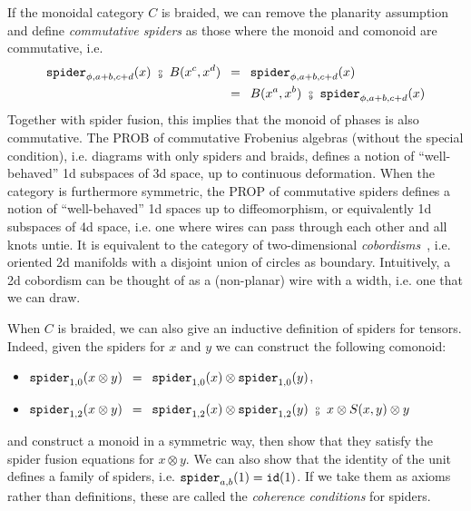 If the monoidal category $C$ is braided, we can remove the planarity assumption and define \emph{commutative spiders} as those where the monoid and comonoid are commutative, i.e.
\begin{align*}
\spider_{\phi, a + b, c + d}(x) \ \fcmp \ B(x^c, x^d)
\s &= \s \spider_{\phi, a + b, c + d}(x) \\
\s &= \s
B(x^a, x^b) \ \fcmp \ \spider_{\phi, a + b, c + d}(x)
\end{align*}
Together with spider fusion, this implies that the monoid of phases is also commutative.
The PROB of commutative Frobenius algebras (without the special condition), i.e. diagrams with only spiders and braids, defines a notion of ``well-behaved'' 1d subspaces of 3d space, up to continuous deformation.
When the category is furthermore symmetric, the PROP of commutative spiders defines a notion of ``well-behaved'' 1d spaces up to diffeomorphism, or equivalently 1d subspaces of 4d space, i.e. one where wires can pass through each other and all knots untie.
It is equivalent to the category of two-dimensional \emph{cobordisms}~\cite{Abrams96}, i.e. oriented 2d manifolds with a disjoint union of circles as boundary.
Intuitively, a 2d cobordism can be thought of as a (non-planar) wire with a width, i.e. one that we can draw.

When $C$ is braided, we can also give an inductive definition of spiders for tensors.
Indeed, given the spiders for $x$ and $y$ we can construct the following comonoid:
\begin{itemize}
\item $\mathtt{spider}_{1, 0}(x \otimes y) \enspace = \enspace \mathtt{spider}_{1, 0}(x) \otimes \mathtt{spider}_{1, 0}(y)$,
\item $\spider_{1, 2}(x \otimes y) \s = \s \spider_{1, 2}(x) \otimes \spider_{1, 2}(y) \ \fcmp \ x \otimes S(x, y) \otimes y$
\end{itemize}
and construct a monoid in a symmetric way, then show that they satisfy the spider fusion equations for $x \otimes y$.
We can also show that the identity of the unit defines a family of spiders, i.e. $\mathtt{spider}_{a, b}(1) = \mathtt{id}(1)$.
If we take them as axioms rather than definitions, these are called the \emph{coherence conditions} for spiders.


